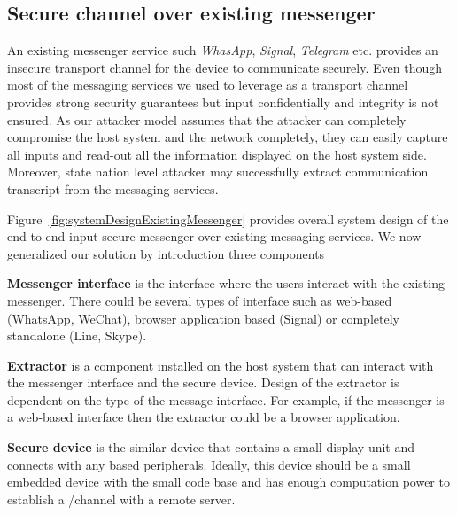 \subsection{Secure channel over existing messenger}
\label{sec:secureMessage:existingMessgenger}

An existing messenger service such \emph{WhasApp}, \emph{Signal}, \emph{Telegram} etc. provides an insecure transport channel for the \usb device to communicate securely. Even though most of the messaging services we used to leverage as a transport channel provides strong security guarantees but input confidentially and integrity is not ensured. As our attacker model assumes that the attacker can completely compromise the host system and the network completely, they can easily capture all inputs and read-out all the information displayed on the host system side. Moreover, state nation level attacker may successfully extract communication transcript from the messaging services.

Figure~\ref{fig:systemDesignExistingMessenger} provides overall system design of the end-to-end input secure messenger over existing messaging services. We now generalized our solution by introduction three components

\mypara \textbf{Messenger interface} is the interface where the users interact with the existing messenger. There could be several types of interface such as web-based (WhatsApp, WeChat), browser application based (Signal) or completely standalone (Line, Skype).

\mypara \textbf{Extractor} is a component installed on the host system that can interact with the messenger interface and the secure \usb device. Design of the extractor is dependent on the type of the message interface. For example, if the messenger is a web-based interface then the extractor could be a browser application.
  
\mypara \textbf{Secure \usb device} is the similar \usb device that contains a small display unit and connects with any \usb based peripherals. Ideally, this device should be a small embedded device with the small code base and has enough computation power to establish a \ssl/\tls channel with a remote server.  


